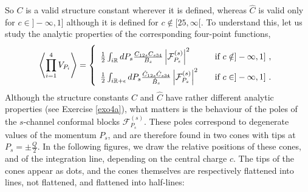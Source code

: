 \documentclass[12pt, a4paper, notitlepage, twoside]{report}
\numberwithin{equation}{section}
\theoremstyle{break}
\begin{document}
So $C$ is a valid structure constant wherever it is defined, whereas $\hat C$ is valid only for $c\in ]-\infty, 1]$ although it is defined for $c\notin [25,\infty[$.
To understand this, let us study the analytic properties of the corresponding four-point functions,
\begin{align}
\renewcommand{\arraystretch}{2}
 \left< \prod_{i=1}^4 V_{P_i}\right> = 
 \left\{\begin{array}{ll} 
         \frac12 \int_{i\mathbb{R}} dP_s \frac{C_{12s}C_{s34}}{B_s} \left|\mathcal{F}_{P_s}^{(s)} \right|^2 \quad & \text{if } c\notin ]-\infty, 1]\ ,
         \\
         \frac12 \int_{i\mathbb{R}+\epsilon} dP_s \frac{\hat C_{12s}\hat C_{s34}}{\hat B_s} \left|\mathcal{F}_{P_s}^{(s)} \right|^2 \quad & \text{if } c\in ]-\infty, 1]\ .
        \end{array}
 \right.
 \label{vfcch}
\end{align}
Although the structure constants $C$ and $\hat C$ have rather different analytic properties (see Exercise \ref{exo4a}), what matters is the behaviour of the poles of the $s$-channel conformal blocks $\mathcal{F}_{P_s}^{(s)}$. 
These poles correspond to degenerate values of the momentum $P_s$, and are therefore found in two cones with tips at $P_s= \pm\frac{Q}{2}$. 
In the following figures, we draw the relative positions of these cones, and of the integration line, depending on the central charge $c$. 
The tips of the cones appear as dots, and the cones themselves are respectively flattened into lines, not flattened, and flattened into half-lines:
\end{document}

